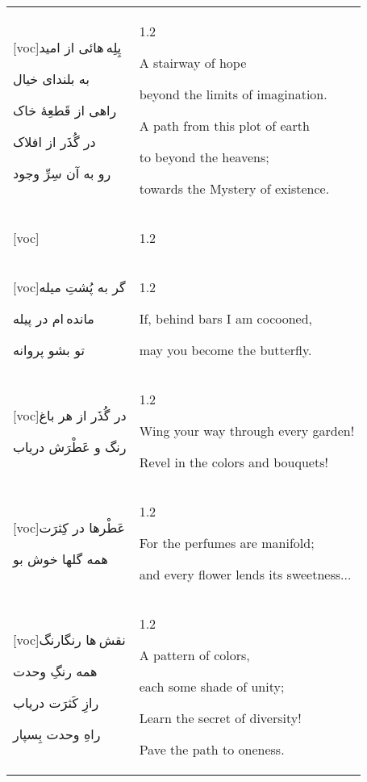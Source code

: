 \documentclass[11pt]{article}
\makeatletter
\newenvironment{orig}
  {\begin{farsi}[voc]}
  {\end{farsi}}
\newenvironment{trans}
  {\Large\begin{spacing}{1.2}\raggedright}
  {\end{spacing}}
\newenvironment{word}
  {\begin{longtable}[t]{p{2.75in}@{\hspace{3em}}p{2.875in}}}
  {\end{longtable}}
\newcommand{\ayat}[2]{\begin{orig}#1\end{orig} & \begin{trans}#2\end{trans}}
\makeatother
\begin{document}
\begin{word}
\ayat{پِلِه هائی از امید

به بلندای خیال

راهی از قَطعِۀ خاک

در گُذَر از افلاک

رو به آن سِرِّ وجود}{
\vspace{1em}
A stairway of hope

beyond the limits of imagination.

A path from this plot of earth

to beyond the heavens;

towards the Mystery of existence.
} \vspace{-1ex}\\

\ayat{}{*} \vspace{-1ex}\\

\ayat{گر به پُشتِ میله

مانده ام در پیله

تو بشو پروانه}{
\vspace{1em}
If, behind bars I am cocooned,

may you become the butterfly.
} \vspace{-1ex}\\

\ayat{در گُذَر از هر باغ

رنگ و عَطْرَش دریاب}{
\vspace{1em}
Wing your way through every garden!

Revel in the colors and bouquets!
} \vspace{-1ex}\\

\ayat{عَطْرها در کِثرَت

همه گلها خوش بو}{
\vspace{1em}
For the perfumes are manifold;

and every flower lends its sweetness...
} \vspace{-1ex}\\

\ayat{نقش ها رنگارنگ

همه رنگِ وحدت

رازِ کَثرَت دریاب

راهِ وحدت بِسپار}{
\vspace{1em}
A pattern of colors,

each some shade of unity;

Learn the secret of diversity!

Pave the path to oneness.
} \vspace{-1ex}\\


\end{word}
\end{document}

